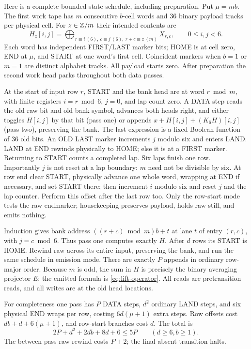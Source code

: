 \begin{informalproof}
Here is a complete bounded-state schedule, including preparation. Put
$\mu=mb$. The first work tape has $m$ consecutive $b$-cell words and
$36$ binary payload tracks per physical cell. For $z\in\mathbb{Z}/m$ their
intended contents are
\[
 H_z[i,j]=\bigoplus_{r\equiv i\ (6),\ c\equiv j\ (6),\ r+c\equiv z\ (m)}X_{r,c},
 \qquad 0\le i,j<6.
\]
Each word has independent FIRST/LAST marker bits; HOME is at cell zero,
END at $\mu$, and START at one word's first cell. Coincident markers
when $b=1$ or $m=1$ are distinct alphabet tracks. All payload starts zero.
After preparation the second work head parks throughout both data passes.

At the start of input row $r$, START and the bank head are at word
$r\bmod m$, with finite registers $i=r\bmod6$, $j=0$, and lap count zero.
A DATA step reads the old raw bit and old bank symbol, advances both heads
right, and either toggles $H[i,j]$ by that bit (pass one) or appends
$x+H[i,j]+(K_6H)[i,j]$ (pass two), preserving the bank. The last expression
is a fixed Boolean function of $36$ old bits. An OLD LAST marker increments
$j$ modulo six and enters LAND. LAND at END rewinds physically to HOME;
else it is at a FIRST marker. Returning to START counts a completed lap.
Six laps finish one row. Importantly $j$ is not reset at a lap boundary:
$m$ need not be divisible by six. At row end clear START, physically advance
one whole word, wrapping at END if necessary, and set START there; then
increment $i$ modulo six and reset $j$ and the lap counter. Perform this
offset after the last row too. Only the row-start mode tests the raw
endmarker; housekeeping preserves payload, holds raw still, and emits
nothing.

Induction gives bank address $((r+c)\bmod m)b+t$ at lane $t$ of entry
$(r,c)$, with $j=c\bmod6$. Thus pass one computes exactly $H$. After
$d$ rows its START is HOME. Rewind raw across its entire input, preserving
the bank, and run the same schedule in emission mode. There are exactly
$P$ appends in ordinary row-major order. Because $m$ is odd, the sum in
$H$ is precisely the binary averaging projector $E$; the emitted formula
is \eqref{eq:lift-operator}. All reads are pretransition reads, and all
writes are at the old head locations.

For completeness one pass has $P$ DATA steps, $d^2$ ordinary LAND steps,
and six physical END wraps per row, costing $6d(\mu+1)$ extra steps.
Row offsets cost $db+d+6(\mu+1)$, and row-start branches cost $d$.
The total is
\[
 2P+d^2+2db+8d+6\le5P\qquad(d\ge6,b\ge1).
\]
The between-pass raw rewind costs $P+2$; the final absent transition halts.


\end{informalproof}
